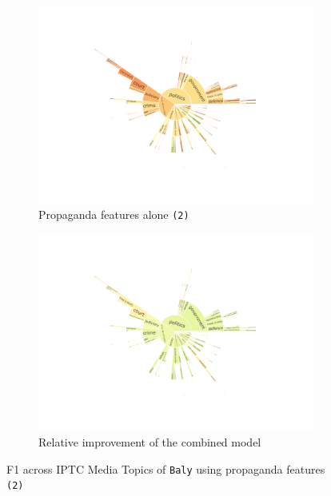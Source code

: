 \begin{figure}[!htbp]
    \centering
	\begin{subfigure}{\textwidth}
            \centering
    \includegraphics[trim={2.2cm 2cm 2.2cm 2cm},clip,width=\linewidth]{figures/baly_iptc_weighted_f1_media_propaganda_percentages.pdf}
    \caption{Propaganda features alone \texttt{(2)}}
    \label{fig:baly_iptc_weighted_f1_media_propaganda_percentages}
\end{subfigure}
\begin{subfigure}{\textwidth}
            \centering
    \includegraphics[trim={2.2cm 2cm 2.2cm 2cm},clip,width=\linewidth]{figures/baly_iptc_weighted_f1_media_delta.pdf}
    \caption{Relative improvement of the combined model}
    \label{fig:baly_iptc_weighted_f1_media_delta}
\end{subfigure}
\caption{F1 across IPTC Media Topics of \texttt{Baly} using propaganda features \texttt{(2)}}
    \label{fig:baly_iptc_weighted_f1_media_prop}
\end{figure}

